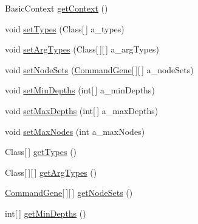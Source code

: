 \begin{DoxyCompactItemize}
\item 
Basic\-Context \hyperlink{interfaceorg_1_1jgap_1_1distr_1_1grid_1_1gp_1_1_i_grid_configuration_g_p_a3aa1f93f63febefbe36959662d0417bd}{get\-Context} ()
\item 
void \hyperlink{interfaceorg_1_1jgap_1_1distr_1_1grid_1_1gp_1_1_i_grid_configuration_g_p_aa7705e8e26bdc18c2c0e5b69e8ac818a}{set\-Types} (Class\mbox{[}$\,$\mbox{]} a\-\_\-types)
\item 
void \hyperlink{interfaceorg_1_1jgap_1_1distr_1_1grid_1_1gp_1_1_i_grid_configuration_g_p_a4ee0b6f3cbaa6dfe0cc19bf64e6d6be0}{set\-Arg\-Types} (Class\mbox{[}$\,$\mbox{]}\mbox{[}$\,$\mbox{]} a\-\_\-arg\-Types)
\item 
void \hyperlink{interfaceorg_1_1jgap_1_1distr_1_1grid_1_1gp_1_1_i_grid_configuration_g_p_a6fff6d389a29ad755949be80399428bc}{set\-Node\-Sets} (\hyperlink{classorg_1_1jgap_1_1gp_1_1_command_gene}{Command\-Gene}\mbox{[}$\,$\mbox{]}\mbox{[}$\,$\mbox{]} a\-\_\-node\-Sets)
\item 
void \hyperlink{interfaceorg_1_1jgap_1_1distr_1_1grid_1_1gp_1_1_i_grid_configuration_g_p_a28021b7ac9886c2722d2ca94b43a71b2}{set\-Min\-Depths} (int\mbox{[}$\,$\mbox{]} a\-\_\-min\-Depths)
\item 
void \hyperlink{interfaceorg_1_1jgap_1_1distr_1_1grid_1_1gp_1_1_i_grid_configuration_g_p_a75eba937223ce7311c7c3363dfbbd361}{set\-Max\-Depths} (int\mbox{[}$\,$\mbox{]} a\-\_\-max\-Depths)
\item 
void \hyperlink{interfaceorg_1_1jgap_1_1distr_1_1grid_1_1gp_1_1_i_grid_configuration_g_p_ad8b10401a6651338cfffbb3c82c5a46d}{set\-Max\-Nodes} (int a\-\_\-max\-Nodes)
\item 
Class\mbox{[}$\,$\mbox{]} \hyperlink{interfaceorg_1_1jgap_1_1distr_1_1grid_1_1gp_1_1_i_grid_configuration_g_p_a721a4de44ec636e94b5c950ee4694662}{get\-Types} ()
\item 
Class\mbox{[}$\,$\mbox{]}\mbox{[}$\,$\mbox{]} \hyperlink{interfaceorg_1_1jgap_1_1distr_1_1grid_1_1gp_1_1_i_grid_configuration_g_p_a679723f6a355c57a6cec2772ab0e0d9c}{get\-Arg\-Types} ()
\item 
\hyperlink{classorg_1_1jgap_1_1gp_1_1_command_gene}{Command\-Gene}\mbox{[}$\,$\mbox{]}\mbox{[}$\,$\mbox{]} \hyperlink{interfaceorg_1_1jgap_1_1distr_1_1grid_1_1gp_1_1_i_grid_configuration_g_p_a2b77cf0efbd41aaf632fdca8a55f6ae1}{get\-Node\-Sets} ()
\item 
int\mbox{[}$\,$\mbox{]} \hyperlink{interfaceorg_1_1jgap_1_1distr_1_1grid_1_1gp_1_1_i_grid_configuration_g_p_a77c16a9c894f5e210588043fe85dd303}{get\-Min\-Depths} ()

\end{DoxyCompactItemize}
